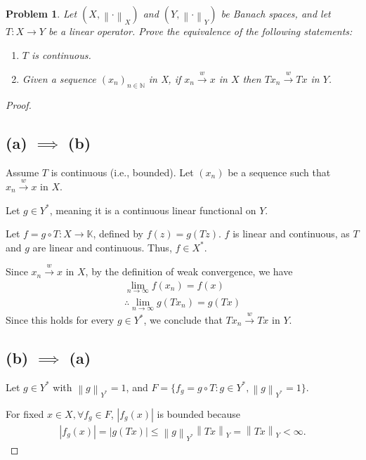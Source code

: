 \documentclass{article}
\newcommand{\norm}[1]{\left\|#1\right\|}
\newtheorem{problem}{Problem}
\begin{document}
\begin{problem}
    Let $(X, \norm{\cdot}_X)$ and $(Y, \norm{\cdot}_Y)$ be Banach spaces, and let $T: X \to Y$ be a linear operator. Prove the equivalence of the following statements:
    \begin{enumerate}
        \item[(a)] $T$ is continuous.
        \item[(b)] Given a sequence $(x_{n})_{n\in\mathbb{N}}$ in X, if $x_{n} \xrightarrow{w} x$ in $X$ then $Tx_{n} \xrightarrow{w} Tx$ in $Y$.
    \end{enumerate}
\end{problem}
\begin{proof}

    \subsection*{(a) $\implies$ (b)}
    Assume $T$ is continuous (i.e., bounded). Let $(x_n)$ be a sequence such that $x_n \xrightarrow{w} x$ in $X$.


    Let $g \in Y^*$, meaning it is a continuous linear functional on $Y$.

    Let $f = g \circ T: X \to \mathbb{K}$, defined by $f(z) = g(Tz)$.
    $f$ is linear and continuous, as $T$ and $g$ are linear and continuous.
    Thus, $f \in X^*$.

    Since $x_n \xrightarrow{w} x$ in $X$, by the definition of weak convergence, we have
    \begin{align}
        \lim_{n \to \infty} f(x_n) = f(x)
        \\
        \therefore
        \lim_{n \to \infty} g(Tx_n) = g(Tx)
    \end{align}
    Since this holds for every $g \in Y^*$, we conclude that $Tx_n \xrightarrow{w} Tx$ in $Y$.



    \subsection*{(b) $\implies$ (a)}

    Let $g \in Y^*$ with $\norm{g}_{Y^*} = 1$,
    and $F = \{f_g = g \circ T : g \in Y^*, \norm{g}_{Y^*} = 1\}$.

    For fixed $x \in X, \forall f_g \in F$, $|f_g(x)|$ is bounded because 
    \begin{align}
        |f_g(x)| = |g(Tx)| 
        \le \norm{g}_{Y^*} \norm{Tx}_Y 
        = \norm{Tx}_Y < \infty.
    \end{align}


\end{proof}
\end{document}
